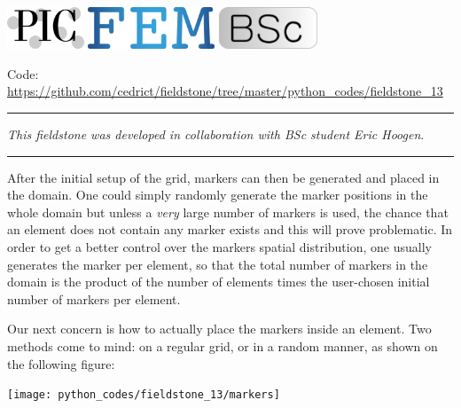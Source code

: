 \includegraphics[height=1.25cm]{images/pictograms/pic}
\includegraphics[height=1.25cm]{images/pictograms/FEM}
\includegraphics[height=1.25cm]{images/pictograms/bsc}



\begin{center}
\inpython 
Code: \url{https://github.com/cedrict/fieldstone/tree/master/python_codes/fieldstone_13}
\end{center}

\par\noindent\rule{\textwidth}{0.4pt}

{\sl This fieldstone was developed in collaboration with BSc student Eric Hoogen}. 

\par\noindent\rule{\textwidth}{0.4pt}



After the initial setup of the grid, markers can then be 
generated and placed in the domain. One could simply randomly generate 
the marker positions in the whole domain but unless a {\it very} large 
number of markers is used, the chance that an element does 
not contain any marker exists and this will prove problematic. 
In order to get a better control over the markers spatial distribution, 
one usually generates the marker per element, so that the total 
number of markers in the domain is the product of the number of 
elements times the user-chosen initial number of markers per element. 

Our next concern is how to actually place the markers inside an element. 
Two methods come to mind: on a regular grid, or in a random manner, 
as shown on the following figure:

\begin{center}
\texttt{[image: python\_codes/fieldstone\_13/markers]} 
\end{center}

